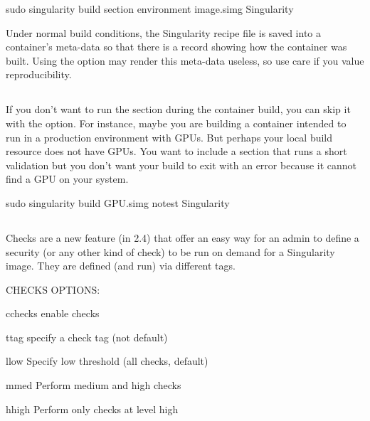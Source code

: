 \documentclass[letterpaper,10pt,english]{sphinxmanual}
\begin{document}
%
\begin{sphinxVerbatim}[commandchars=\\\{\}]
\PYGZdl{} sudo singularity build \PYGZhy{}\PYGZhy{}section environment image.simg Singularity
\end{sphinxVerbatim}

Under normal build conditions, the Singularity recipe file is saved into
a container’s meta-data so that there is a record showing how the
container was built. Using the  option may render this meta-data useless,
so use care if you value reproducibility.


\subsection{}
\label{\detokenize{build_a_container:notest}}
If you don’t want to run the  section during the container build, you can
skip it with the  option. For instance, maybe you are building a
container intended to run in a production environment with GPUs. But
perhaps your local build resource does not have GPUs. You want to
include a  section that runs a short validation but you don’t want your
build to exit with an error because it cannot find a GPU on your system.

%
\begin{sphinxVerbatim}[commandchars=\\\{\}]
\PYGZdl{} sudo singularity build GPU.simg \PYGZhy{}\PYGZhy{}notest Singularity
\end{sphinxVerbatim}


\subsection{}
\label{\detokenize{build_a_container:checks}}
Checks are a new feature (in 2.4) that offer an easy way for an admin
to define a security (or any other kind of check) to be run on demand
for a Singularity image. They are defined (and run) via different
tags.

%
\begin{sphinxVerbatim}[commandchars=\\\{\}]
CHECKS OPTIONS:

    \PYGZhy{}c\textbar{}\PYGZhy{}\PYGZhy{}checks    enable checks

    \PYGZhy{}t\textbar{}\PYGZhy{}\PYGZhy{}tag       specify a check tag (not default)

    \PYGZhy{}l\textbar{}\PYGZhy{}\PYGZhy{}low       Specify low threshold (all checks, default)

    \PYGZhy{}m\textbar{}\PYGZhy{}\PYGZhy{}med       Perform medium and high checks

    \PYGZhy{}h\textbar{}\PYGZhy{}\PYGZhy{}high      Perform only checks at level high
\end{sphinxVerbatim}
\end{document}
